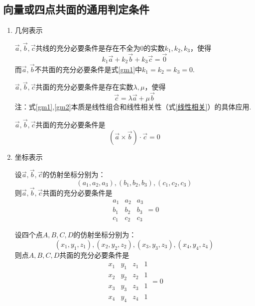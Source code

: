 \subsection{向量或四点共面的通用判定条件}
\begin{enumerate}[1.]
	\setlength{\itemindent}{0em}
	\setlength{\topsep}{0.01em}
	\setlength{\itemsep}{0.01em}
	\item {\color{dy2}几何表示}
	
	\enbelowtheorem[共面定理1]
	\quad $\overrightarrow{a},\overrightarrow{b},\overrightarrow{c}$共线的充分必要条件是存在不全为$0$的实数$k_1,k_2,k_3 $，使得
	\begin{equation}
		k_1\overrightarrow{a}+k_2\overrightarrow{b}+k_3\overrightarrow{c}=\overrightarrow{0}
		\label{gm1}
	\end{equation}
	{\color{dy} 而$\overrightarrow{a},\overrightarrow{b}$不共面的充分必要条件是式\eqref{gm1}中$k_1=k_2=k_3=0 $.}
	
	\newpage
	\addentheorem[共面定理2]
	\quad $\overrightarrow{a},\overrightarrow{b},\overrightarrow{c}$共面的充分必要条件是存在实数$\lambda ,\mu $，使得
	\begin{equation}
		\overrightarrow{c}=\lambda \overrightarrow{a}+\mu\overrightarrow{b}
		\label{gm2}
	\end{equation}
	{\color{dy}\qquad 注：式\eqref{gm1},\eqref{gm2}本质是线性组合和线性相关性（式\eqref{线性相关}）的具体应用. }
	
	
	\addentheorem[共面定理3]
	\quad $\overrightarrow{a},\overrightarrow{b},\overrightarrow{c}$共面的充分必要条件是
	\begin{equation}
		\left( \overrightarrow{a}\times\overrightarrow{b}\right) \cdot \overrightarrow{c}=0
	\end{equation}
	
	\item {\color{dy2}坐标表示}
	
	\enbelowtheorem[共面定理4]
	\quad 设$\overrightarrow{a},\overrightarrow{b},\overrightarrow{c}$的仿射坐标分别为：
	$$(a_1,a_2,a_3),(b_1,b_2,b_3),(c_1,c_2,c_3)$$
	则$\overrightarrow{a},\overrightarrow{b},\overrightarrow{c}$共面的充分必要条件是
	\begin{equation}
		\begin{array}{|ccc|}
			a_1 & a_2 & a_3 \\
			b_1 & b_2 & b_3 \\
			c_1 & c_2 & c_3
		\end{array}=0
	\end{equation}
	
	
	\addentheorem[共面定理5]
	\quad 设四个点$A,B,C,D$的仿射坐标分别为：
	$$(x_1,y_1,z_1),(x_2,y_2,z_2),(x_3,y_3,z_3),(x_4,y_4,z_4)$$
	则点$A,B,C,D$共面的充分必要条件是
	\begin{equation}
		\begin{array}{|cccc|}
			x_1 & y_1 & z_1 & 1 \\
			x_2 & y_2 & z_2 & 1 \\
			x_3 & y_3 & z_3 & 1 \\
			x_4 & y_4 & z_4 & 1
		\end{array}=0
		\label{SDGM}
	\end{equation}
\end{enumerate} 
